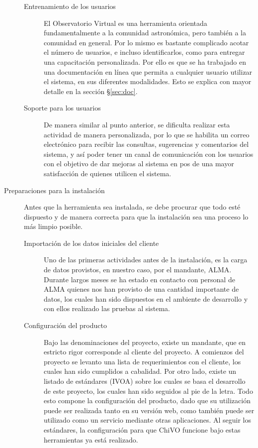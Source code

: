 \begin{description}
\begin{description}
			\item [Entrenamiento de los usuarios] El Observatorio Virtual es una herramienta orientada fundamentalmente a la comunidad astronómica, pero tambi\'en a la comunidad en general. Por lo mismo es bastante complicado acotar el número de usuarios, e incluso identificarlos, como para entregar una capacitación personalizada. Por ello es que se ha trabajado en una documentación en línea que permita a cualquier usuario utilizar el sistema, en sus diferentes modalidades. Esto se explica con mayor detalle en la sección \S\ref{sec:doc}.
			\item [Soporte para los usuarios] De manera similar al punto anterior, se dificulta realizar esta actividad de manera personalizada, por lo que se habilita un correo electrónico\footnotemark{} para recibir las consultas, sugerencias y comentarios del sistema, y así poder tener un canal de comunicación con los usuarios con el objetivo de dar mejoras al sistema en pos de una mayor satisfacción de quienes utilicen el sistema.
		\end{description}
	\item [Preparaciones para la instalación] Antes que la herramienta sea instalada, se debe procurar que todo est\'e dispuesto y de manera correcta para que la instalación sea una proceso lo más limpio posible.
		\begin{description}
			\item [Importación de los datos iniciales del cliente] Uno de las primeras actividades antes de la instalación, es la carga de datos provistos, en nuestro caso, por el mandante, ALMA. Durante largos meses se ha estado en contacto con personal de ALMA quienes nos han provisto de una cantidad importante de datos, los cuales han sido dispuestos en el ambiente de desarrollo y con ellos realizado las pruebas al sistema.
			\item [Configuración del producto] Bajo las denominaciones del proyecto, existe un mandante, que en estricto rigor corresponde al cliente del proyecto. A comienzos del proyecto se levanto una lista de requerimientos con el cliente, los cuales han sido cumplidos a cabalidad. Por otro lado, existe un listado de estándares (IVOA) sobre los cuales se basa el desarrollo de este proyecto, los cuales han sido seguidos al pie de la letra. Todo esto compone la configuración del producto, dado que su utilización puede ser realizada tanto en su versión web, como tambi\'en puede ser utilizado como un servicio mediante otras aplicaciones. Al seguir los estándares, la configuración para que ChiVO funcione bajo estas herramientas ya está realizado.

\end{description}
\end{description}
